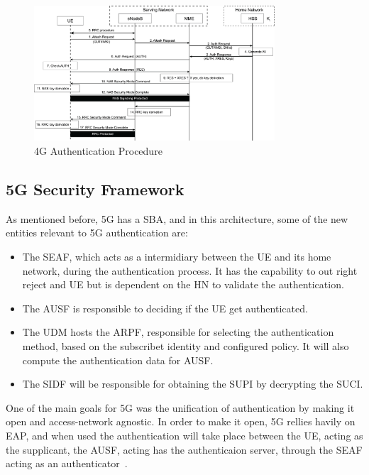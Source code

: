 \begin{figure}[htbp]
    \centering
    \includegraphics[width=0.8\textwidth]{figs/4g-authentication-flow.png}
    \caption{\ac{4G} Authentication Procedure}
    \label{fig:single}
\end{figure}

\subsection{\acs{5G} Security Framework}

As mentioned before, \ac{5G} has a \acl{SBA}, and in this architecture, some of the new entities relevant to \ac{5G} authentication are:

\begin{itemize}
    \item{
        The \ac{SEAF}, which acts as a intermidiary between the \ac{UE} and its home network, during the authentication process. It has the capability to out right reject and \ac{UE} but is dependent on the \ac{HN} to validate the authentication.
    }
    \item{
        The \ac{AUSF} is responsible to deciding if the \ac{UE} get authenticated.
    }
    \item{
        The \ac{UDM} hosts the \ac{ARPF}, responsible for selecting the authentication method, based on the subscribet identity and configured policy. It will also compute the authentication data for \ac{AUSF}.
    }
    \item{
        The \ac{SIDF} will be responsible for obtaining the \ac{SUPI} by decrypting the \ac{SUCI}.
    }
\end{itemize}

One of the main goals for \ac{5G} was the unification of authentication by making it open and access-network agnostic. In order to make it open, \ac{5G} rellies havily on \ac{EAP}, and when used the authentication will take place between the \ac{UE}, acting as the supplicant, the \ac{AUSF}, acting has the authenticaion server, through the \ac{SEAF} acting as an authenticator~\cite{rfc3748}.

